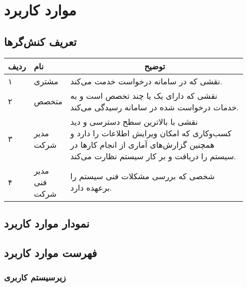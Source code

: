 
\chapter{موارد کاربرد}


\section{تعریف کنش‌گر‌ها}


\begin{table}[h]
	\setlength\extrarowheight{-5pt}
	\centering
	\begin{tabular}{|p{0.05\linewidth}|p{0.15\linewidth}|p{0.75\linewidth}|} 
\hline
\multicolumn{1}{|c|}{\textbf{ردیف}} & \textbf{نام}  & \multicolumn{1}{c|}{\textbf{توضیح}}                                                                                                                                  \\ \hline
۱                                   & مشتری         & نقشی که در سامانه درخواست خدمت می‌کند.                                                                                                                               \\ \hline
۲                                   & متخصص         & نقشی که دارای یک یا چند تخصص است و به خدمات درخواست شده در سامانه رسیدگی می‌کند.                                                                                     \\ \hline
۳                                   & مدیر شرکت     & نقشی با بالاترین سطح دسترسی و دید کسب‌و‌کاری که امکان ویرایش اطلاعات را دارد و همچنین گزارش‌های آماری از انجام کارها در سیستم را دریافت و بر کار سیستم نظارت می‌کند. \\ \hline
۴                                   & مدیر فنی شرکت & شخصی که بررسی مشکلات فنی سیستم را برعهده دارد.  
 \\ \hline

	\end{tabular}
\end{table}

\section{نمودار موارد کاربرد}


\newpage
\section{فهرست موارد کاربرد}


\subsection{زیرسیستم کاربری}

